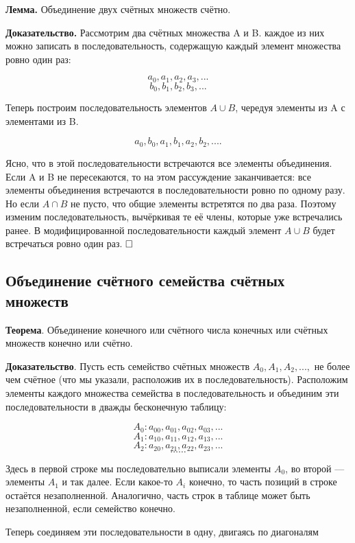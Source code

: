 \documentclass[a4paper, 10pt]{article}
\begin{document}
\textbf{Лемма.} Объединение двух счётных множеств счётно.

\medskip

\textbf{Доказательство.} Рассмотрим два счётных множества A и B. каждое из них можно записать в последовательность, содержащую каждый элемент множества ровно один раз:

$$a_0, a_1, a_2, a_3, ...$$
$$b_0, b_1, b_2, b_3, ...$$

Теперь построим последовательность элементов $A \cup B$, чередуя элементы из A с элементами из B.

$$a_0, b_0, a_1, b_1, a_2, b_2, ....$$

Ясно, что в этой последовательности встречаются все элементы объединения. Если A и B не пересекаются, то на этом рассуждение заканчивается: все элементы объединения встречаются в последовательности ровно по одному разу. Но если $A \cap B$ не пусто, что общие элементы встретятся по два раза. Поэтому изменим последовательность, вычёркивая те её члены, которые уже встречались ранее. В модифицированной последовательности каждый элемент $A \cup B$ будет встречаться ровно один раз. $\hfill \square$



\subsection{Объединение счётного семейства счётных множеств}


\textbf{Теорема}. Объединение конечного или счётного числа конечных или счётных множеств конечно или счётно.

\textbf{Доказательство}. Пусть есть семейство счётных множеств $A_0, A_1, A_2, . . .,$ не более чем счётное (что мы указали, расположив их в последовательность). Расположим элементы каждого множества семейства в последовательность и объединим эти последовательности в дважды бесконечную таблицу:

$$A_0: a_{00}, a_{01}, a_{02}, a_{03}, ...$$
$$A_1: a_{10}, a_{11}, a_{12}, a_{13}, ...$$
$$A_2: a_{20}, a_{21}, a_{22}, a_{23}, ...$$
$$\ldots \ldots$$

Здесь в первой строке мы последовательно выписали элементы $A_0$, во второй — элементы $A_1$ и так далее. Если какое-то $A_i$ конечно, то часть позиций в строке остаётся незаполненной. Аналогично, часть строк в таблице может быть незаполненной, если семейство конечно.

Теперь соединяем эти последовательности в одну, двигаясь по диагоналям
\end{document}
